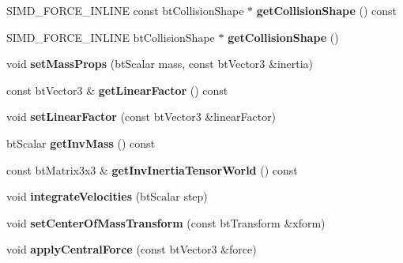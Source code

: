 \begin{DoxyCompactItemize}
\item 
\mbox{\label{classbtRigidBody_a09847b287e58981e6b7cfc825f514ab2}} 
S\+I\+M\+D\+\_\+\+F\+O\+R\+C\+E\+\_\+\+I\+N\+L\+I\+NE const bt\+Collision\+Shape $\ast$ {\bfseries get\+Collision\+Shape} () const
\item 
\mbox{\label{classbtRigidBody_a4c79924fbf05ebb79859758b650841b8}} 
S\+I\+M\+D\+\_\+\+F\+O\+R\+C\+E\+\_\+\+I\+N\+L\+I\+NE bt\+Collision\+Shape $\ast$ {\bfseries get\+Collision\+Shape} ()
\item 
\mbox{\label{classbtRigidBody_a912b4a273bcd6fe9af25c47106db900c}} 
void {\bfseries set\+Mass\+Props} (bt\+Scalar mass, const bt\+Vector3 \&inertia)
\item 
\mbox{\label{classbtRigidBody_a39ea489339ebdc7c4e005e6b0b43fcca}} 
const bt\+Vector3 \& {\bfseries get\+Linear\+Factor} () const
\item 
\mbox{\label{classbtRigidBody_a00cf3fa28987ffb77764e5bd3605e3ef}} 
void {\bfseries set\+Linear\+Factor} (const bt\+Vector3 \&linear\+Factor)
\item 
\mbox{\label{classbtRigidBody_a4c67acaeab4799ffda7a0d8a63df7ae6}} 
bt\+Scalar {\bfseries get\+Inv\+Mass} () const
\item 
\mbox{\label{classbtRigidBody_ab328d8f35b8c62a4ee0dc5f111b81b37}} 
const bt\+Matrix3x3 \& {\bfseries get\+Inv\+Inertia\+Tensor\+World} () const
\item 
\mbox{\label{classbtRigidBody_a16029bc5aabcbb33aaf7e6e6e819283a}} 
void {\bfseries integrate\+Velocities} (bt\+Scalar step)
\item 
\mbox{\label{classbtRigidBody_adeaff2386513eeaaa138e0e3b3acca66}} 
void {\bfseries set\+Center\+Of\+Mass\+Transform} (const bt\+Transform \&xform)
\item 
\mbox{\label{classbtRigidBody_a48478896407083f4ff64299e0c3c4a32}} 
void {\bfseries apply\+Central\+Force} (const bt\+Vector3 \&force)
\item 

\end{DoxyCompactItemize}
